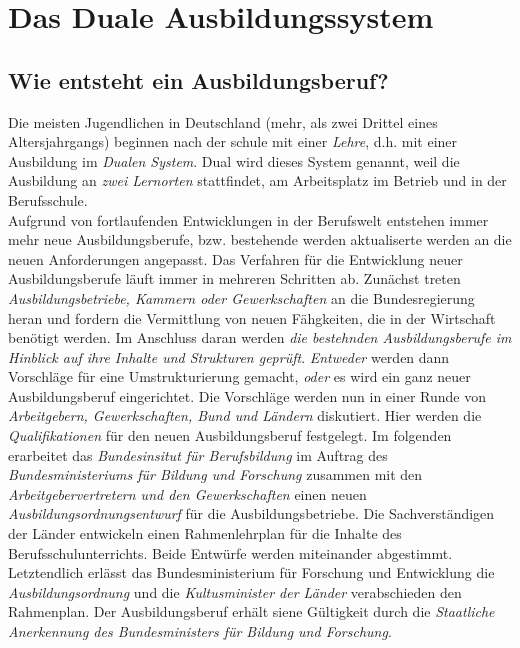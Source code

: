 \documentclass[a4paper, 12pt]{report}
\begin{document}
\section{Das Duale Ausbildungssystem}

\subsection{Wie entsteht ein Ausbildungsberuf?}

Die meisten Jugendlichen in Deutschland (mehr, als zwei Drittel eines 
Altersjahrgangs) beginnen nach der schule mit einer \emph{Lehre}, d.h. mit 
einer Ausbildung im \emph{Dualen System}. Dual wird dieses System genannt, weil
die Ausbildung an \emph{zwei Lernorten} stattfindet, am Arbeitsplatz im Betrieb
und in der Berufsschule. \\

Aufgrund von fortlaufenden Entwicklungen in der Berufswelt entstehen immer mehr 
neue Ausbildungsberufe, bzw. bestehende werden aktualiserte werden an die neuen 
Anforderungen angepasst. Das Verfahren für die Entwicklung neuer 
Ausbildungsberufe läuft immer in mehreren Schritten ab. Zunächst treten \emph{
Ausbildungsbetriebe, Kammern oder Gewerkschaften} an die Bundesregierung heran 
und fordern die Vermittlung von neuen Fähgkeiten, die in der Wirtschaft benötigt 
werden. Im Anschluss daran werden \emph{die bestehnden Ausbildungsberufe im 
Hinblick auf ihre Inhalte und Strukturen geprüft}. \emph{Entweder} werden dann 
Vorschläge für eine Umstrukturierung gemacht, \emph{oder} es wird ein ganz neuer 
Ausbildungsberuf eingerichtet. Die Vorschläge werden nun in einer Runde von 
\emph{Arbeitgebern, Gewerkschaften, Bund und Ländern} diskutiert. Hier werden 
die \emph{Qualifikationen} für den neuen Ausbildungsberuf festgelegt. Im 
folgenden erarbeitet das \emph{Bundesinsitut für Berufsbildung} im Auftrag des 
\emph{Bundesministeriums für Bildung und Forschung} zusammen mit den 
\emph{Arbeitgebervertretern und den Gewerkschaften} einen neuen 
\emph{Ausbildungsordnungsentwurf} für die Ausbildungsbetriebe. Die 
Sachverständigen der Länder entwickeln einen Rahmenlehrplan für die Inhalte des 
Berufsschulunterrichts. Beide Entwürfe werden miteinander abgestimmt. 
Letztendlich erlässt das Bundesministerium für Forschung und Entwicklung die 
\emph{Ausbildungsordnung} und die \emph{Kultusminister der Länder} verabschieden 
den Rahmenplan. Der Ausbildungsberuf erhält siene Gültigkeit durch die 
\emph{Staatliche Anerkennung des Bundesministers für Bildung und Forschung}. \\
\end{document}
